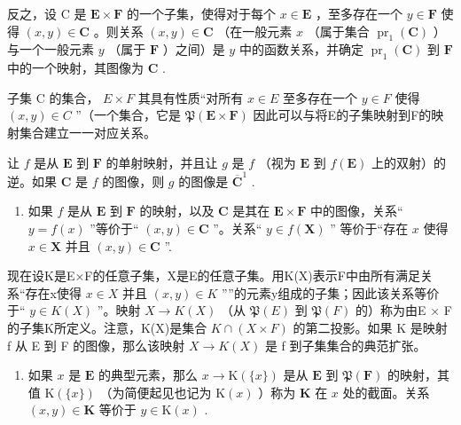 反之，设 C 是 \(\mathbf{E} \times \mathbf{F}\) 的一个子集，使得对于每个 \(x \in \mathbf{E}\) ，至多存在一个 \(y \in \mathbf{F}\) 使得 \((x, y) \in \mathbf{C}\) 。则关系 \((x, y) \in \mathbf{C}\) （在一般元素 \(x\) （属于集合 \(\operatorname{pr}_1(\mathbf{C})\) ）与一个一般元素 \(y\) （属于 \(\mathbf{F}\) ）之间）是 \(y\) 中的函数关系，并确定 \(\operatorname{pr}_1(\mathbf{C})\) 到 \(\mathbf{F}\) 中的一个映射，其图像为 \(\mathbf{C}\) .

子集 C 的集合， \(E \times F\) 其具有性质“对所有 \(x \in E\) 至多存在一个 \(y \in F\) 使得 \((x, y) \in C\) ''（一个集合，它是 \(\mathfrak{P}(\mathbf{E} \times \mathbf{F})\) 因此可以与将E的子集映射到F的映射集合建立一一对应关系。

让 \(f\) 是从 \(\mathbf{E}\) 到 \(\mathbf{F}\) 的单射映射，并且让 \(g\) 是 \(f\) （视为 \(\mathbf{E}\) 到 \(f(\mathbf{E})\) 上的双射）的逆。如果 \(\mathbf{C}\) 是 \(f\) 的图像，则 \(g\) 的图像是 \(\overline{\mathbf{C}}^1\) .

\begin{enumerate}
\def\labelenumi{\arabic{enumi}.}
\setcounter{enumi}{5}
\tightlist
\item
  如果 \(f\) 是从 \(\mathbf{E}\) 到 \(\mathbf{F}\) 的映射，以及 \(\mathbf{C}\) 是其在 \(\mathbf{E} \times \mathbf{F}\) 中的图像，关系“ \(y = f(x)\) ”等价于“ \((x, y) \in \mathbf{C}\) ''。关系“ \(y \in f(\mathbf{X})\) '' 等价于“存在 \(x\) 使得 \(x \in \mathbf{X}\) 并且 \((x, y) \in \mathbf{C}\) ''.
\end{enumerate}

现在设K是E×F的任意子集，X是E的任意子集。用K(X)表示F中由所有满足关系“存在x使得 \(x \in X\) 并且 \((x, y) \in K\) ''”的元素y组成的子集；因此该关系等价于`` \(y \in K(X)\) ''。映射 \(X \to K(X)\) （从 \(\mathfrak{P}(E)\) 到 \(\mathfrak{P}(F)\) 的）称为由E × F的子集K所定义。注意，K(X)是集合 \(K \cap (X \times F)\) 的第二投影。如果 K 是映射 f 从 E 到 F 的图像，那么该映射 \(X \to K(X)\) 是 f 到子集集合的典范扩张。

\begin{enumerate}
\def\labelenumi{\arabic{enumi}.}
\setcounter{enumi}{6}
\tightlist
\item
  如果 \(x\) 是 \(\mathbf{E}\) 的典型元素，那么 \(x \to \mathrm{K}(\{x\})\) 是从 \(\mathbf{E}\) 到 \(\mathfrak{P}(\mathbf{F})\) 的映射，其值 \(\mathrm{K}(\{x\})\) （为简便起见也记为 \(\mathrm{K}(x)\) ）称为 \(\mathbf{K}\) 在 \(x\) 处的截面。关系 \((x, y) \in \mathbf{K}\) 等价于 \(y \in \mathrm{K}(x)\) .
\end{enumerate}

